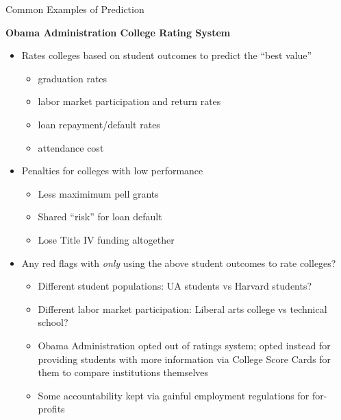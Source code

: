 \documentclass[
  8pt,
  ignorenonframetext,
  dvipsnames]{beamer}
\providecommand{\tightlist}{%
  \setlength{\itemsep}{0pt}\setlength{\parskip}{0pt}}
\renewcommand{\textbf}[1]{{\color{darkgray}\bfseries\fontfamily{Montserrat-TOsF}#1}}
\let\olditem\item
\renewcommand{\item}{%
  \olditem\vspace{4pt}
}
\begin{document}
\begin{frame}{Common Examples of Prediction}
\protect\hypertarget{common-examples-of-prediction-1}{}

\textbf{Obama Administration College Rating System}

\begin{itemize}
\item
  Rates colleges based on student outcomes to predict the ``best value''

  \begin{itemize}
  \tightlist
  \item
    graduation rates
  \item
    labor market participation and return rates
  \item
    loan repayment/default rates
  \item
    attendance cost
  \end{itemize}
\end{itemize}

\medskip

\begin{itemize}
\item
  Penalties for colleges with low performance

  \begin{itemize}
  \tightlist
  \item
    Less maximimum pell grants
  \item
    Shared ``risk'' for loan default
  \item
    Lose Title IV funding altogether
  \end{itemize}
\end{itemize}

\medskip

\begin{itemize}
\item
  Any red flags with \emph{only} using the above student outcomes to
  rate colleges?

  \begin{itemize}
  \tightlist
  \item
    Different student populations: UA students vs Harvard students?
  \item
    Different labor market participation: Liberal arts college vs
    technical school?
  \item
    Obama Administration opted out of ratings system; opted instead for
    providing students with more information via College Score Cards for
    them to compare institutions themselves
  \item
    Some accountability kept via gainful employment regulations for
    for-profits
  \end{itemize}
\end{itemize}

\end{frame}
\end{document}
